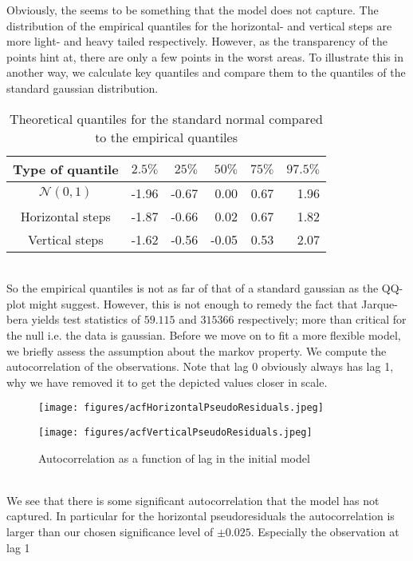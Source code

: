 Obviously, the seems to be something that the model does not capture. The distribution of the empirical quantiles for the horizontal- and vertical steps are more light- and heavy tailed respectively. However, as the transparency of the points hint at, there are only a few points in the worst areas. To illustrate this in another way, we calculate key quantiles and compare them to the quantiles of the standard gaussian distribution.
\begin{table}[h]
    \centering
    \begin{tabular}{crrrrr}
      \hline
     Type of quantile & $2.5\%$ & $25\%$ & $50\%$ & $75\%$ & $97.5\%$ \\ 
     \hline
     $\mathcal{N}(0,1)$ & -1.96 & -0.67 & 0.00 & 0.67 & 1.96 \\ 
     Horizontal steps & -1.87 & -0.66 & 0.02 & 0.67 & 1.82 \\ 
     Vertical steps & -1.62 & -0.56 & -0.05 & 0.53 & 2.07 \\ 
        \hline
    \end{tabular}
    \caption{Theoretical quantiles for the standard normal compared to the empirical quantiles}
\end{table}\\
So the empirical quantiles is not as far of that of a standard gaussian as the QQ-plot might suggest. However, this is not enough to remedy the fact that Jarque-bera \cite{tseries} yields test statistics of $59.115$ and $315366$ respectively; more than critical for the null i.e. the data is gaussian. Before we move on to fit a more flexible model, we briefly assess the assumption about the markov property. We compute the autocorrelation of the observations. Note that lag 0 obviously always has lag 1, why we have removed it to get the depicted values closer in scale.
\begin{figure}[h]
  \centering
  \begin{minipage}[b]{0.34\textwidth}
    \texttt{[image: figures/acfHorizontalPseudoResiduals.jpeg]}
  \end{minipage}
  \hspace{0.03\textwidth}
  \begin{minipage}[b]{0.34\textwidth}
    \texttt{[image: figures/acfVerticalPseudoResiduals.jpeg]}
  \end{minipage}
  \caption{Autocorrelation as a function of lag in the initial model}
  \label{combinedACFPlots}
\end{figure}\\
We see that there is some significant autocorrelation that the model has not captured. In particular for the horizontal pseudoresiduals the autocorrelation is larger than our chosen significance level of $\pm 0.025$. Especially the observation at lag 1\newpage
